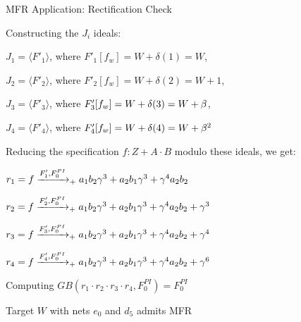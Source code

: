 \begin{frame}{\large MFR Application: Rectification Check}
\bi
	\item Constructing the $J_i$ ideals:
	\bi
		\item {\small$J_1 = \langle F'_1\rangle$, where $F'_1[f_w]=W+\delta(1)=W$},
		\item {\small$J_2 = \langle F'_2\rangle$, where $F'_2[f_w]=W+\delta(2)=W+1$},
		\item {\small$J_3 = \langle F'_3\rangle$, where $F'_3[f_w]=W+\delta(3)=W+\beta$},
		\item {\small$J_4 = \langle F'_4\rangle$, where $F'_4[f_w]=W+\delta(4)=W+\beta^2$}
	\ei
	\vspace{0.1in}
	\item Reducing the specification $f: Z+A\cdot B$ modulo these ideals, we get:
	\bi
		\item $r_1 = f \xrightarrow[]{F'_1,F_{0}^{PI}}_+{a_1b_2\gamma^3+a_2b_1\gamma^3+\gamma^4a_2b_2}$
		\item $r_2 = f \xrightarrow[]{F'_2,F_{0}^{PI}}_+{a_1b_2\gamma^3+a_2b_1\gamma^3+\gamma^4a_2b_2+\gamma^3}$
		\item $r_3 = f \xrightarrow[]{F'_3,F_{0}^{PI}}_+{a_1b_2\gamma^3+a_2b_1\gamma^3+\gamma^4a_2b_2+\gamma^4}$
		\item $r_4 = f \xrightarrow[]{F'_4,F_{0}^{PI}}_+{a_1b_2\gamma^3+a_2b_1\gamma^3+\gamma^4a_2b_2+\gamma^6}$
	\ei
	\item Computing $GB(r_1\cdot r_2 \cdot r_3 \cdot r_4, F_{0}^{PI})=F_{0}^{PI}$
	\item Target $W$ with nets $e_0$ and $d_5$ admits MFR
\ei
\end{frame}




